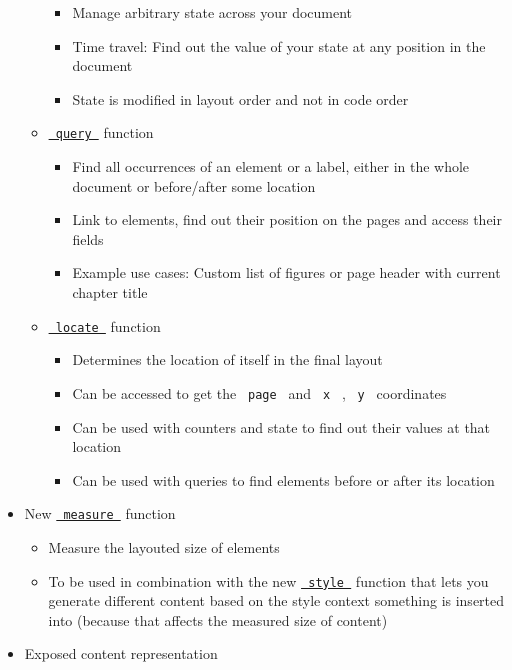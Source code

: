 \begin{itemize}
\begin{itemize}
    \begin{itemize}
    \tightlist
    \item
      Manage arbitrary state across your document
    \item
      Time travel: Find out the value of your state at any position in
      the document
    \item
      State is modified in layout order and not in code order
    \end{itemize}
  \item
    \href{/docs/reference/introspection/query/}{\texttt{\ query\ }}
    function

    \begin{itemize}
    \tightlist
    \item
      Find all occurrences of an element or a label, either in the whole
      document or before/after some location
    \item
      Link to elements, find out their position on the pages and access
      their fields
    \item
      Example use cases: Custom list of figures or page header with
      current chapter title
    \end{itemize}
  \item
    \href{/docs/reference/introspection/locate/}{\texttt{\ locate\ }}
    function

    \begin{itemize}
    \tightlist
    \item
      Determines the location of itself in the final layout
    \item
      Can be accessed to get the \texttt{\ page\ } and \texttt{\ x\ } ,
      \texttt{\ y\ } coordinates
    \item
      Can be used with counters and state to find out their values at
      that location
    \item
      Can be used with queries to find elements before or after its
      location
    \end{itemize}
  \end{itemize}
\item
  New \href{/docs/reference/layout/measure/}{\texttt{\ measure\ }}
  function

  \begin{itemize}
  \tightlist
  \item
    Measure the layouted size of elements
  \item
    To be used in combination with the new
    \href{/docs/reference/foundations/style/}{\texttt{\ style\ }}
    function that lets you generate different content based on the style
    context something is inserted into (because that affects the
    measured size of content)
  \end{itemize}
\item
  Exposed content representation


\end{itemize}
